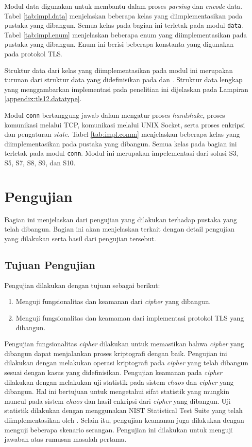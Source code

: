 Modul data digunakan untuk membantu dalam proses \emph{parsing} dan \emph{encode} data. Tabel \ref{tab:impl.data} menjelaskan beberapa kelas yang diimplementasikan pada pustaka yang dibangun. Semua kelas pada bagian ini terletak pada modul \texttt{data}. Tabel \ref{tab:impl.enum} menjelaskan beberapa enum yang diimplementasikan pada pustaka yang dibangun. Enum ini berisi beberapa konstanta yang digunakan pada protokol TLS.

Struktur data dari kelas yang diimplementasikan pada modul ini merupakan turunan dari struktur data yang didefinisikan pada \textcite{rfc5246} dan \textcite{rfc4492}. Struktur data lengkap yang menggambarkan implementasi pada penelitian ini dijelaskan pada Lampiran \ref{appendix:tls12.datatype}.

Modul \texttt{conn} bertanggung jawab dalam mengatur proses \emph{handshake}, proses komunikasi melalui TCP, komunikasi melalui UNIX Socket, serta proses enkripsi dan pengaturan \emph{state}. Tabel \ref{tab:impl.comm} menjelaskan beberapa kelas yang diimplementasikan pada pustaka yang dibangun. Semua kelas pada bagian ini terletak pada modul \texttt{conn}. Modul ini merupakan impelementasi dari solusi S3, S5, S7, S8, S9, dan S10.

\section{Pengujian}
Bagian ini menjelaskan dari pengujian yang dilakukan terhadap pustaka yang telah dibangun. Bagian ini akan menjelaskan terkait dengan detail pengujian yang dilakukan serta hasil dari pengujian tersebut.

\subsection{Tujuan Pengujian}
Pengujian dilakukan dengan tujuan sebagai berikut:
\begin{enumerate}
  \item Menguji fungsionalitas dan keamanan dari \emph{cipher} yang dibangun.
  \item Menguji fungsionalitas dan keamaman dari implementasi protokol TLS yang dibangun.
\end{enumerate}

Pengujian fungsionalitas \emph{cipher} dilakukan untuk memastikan bahwa \emph{cipher} yang dibangun dapat menjalankan proses kriptografi dengan baik. Pengujian ini dilakukan dengan melakukan operasi kriptografi pada \emph{cipher} yang telah dibangun sesuai dengan kasus yang didefinisikan. Pengujian keamanan pada \emph{cipher} dilakukan dengan melakukan uji statistik pada sistem \emph{chaos} dan \emph{cipher} yang dibangun. Hal ini bertujuan untuk mengetahui sifat statistik yang mungkin muncul pada sistem \emph{chaos} dan hasil enkripsi dari \emph{cipher} yang dibangun. Uji statistik dilakukan dengan menggunakan NIST Statistical Test Suite yang telah diimplementasikan oleh \textcite{marek2016}. Selain itu, pengujian keamanan juga dilakukan dengan menguji beberapa skenario serangan. Pengujian ini dilakukan untuk menguji jawaban atas rumusan masalah pertama.

